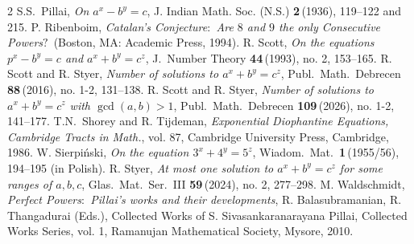 \documentclass[11pt]{amsart}
\numberwithin{equation}{section}
\begin{document}
\begin{thebibliography}{2}
%
S.S.~Pillai,
{\it On $a^x-b^y=c$}, J. Indian Math. Soc. (N.S.) {\bf 2}\,(1936), 119--122 and 215.
%
P. Ribenboim,
{\it Catalan's Conjecture$:$ Are $8$ and $9$ the only Consecutive Powers$?$}\,
(Boston, MA: Academic Press, 1994).
%
R. Scott,
{\it On the equations $p^x-b^y=c$ and $a^x+b^y=c^z$},
J.\ Number Theory {\bf 44}\,(1993), no. 2, 153--165.
%
R. Scott and R. Styer,
{\it Number of solutions to $a^x+b^y=c^z$},
Publ.\ Math.\ Debrecen {\bf 88}\,(2016), no. 1-2, 131--138.
%
R. Scott and R. Styer, 
{\it Number of solutions to $a^x+b^y=c^z$ with $\gcd(a,b)>1$}, 
Publ.\ Math.\ Debrecen {\bf 109}\,(2026), no. 1-2, 141--177.
%
T.N.~Shorey and R. Tijdeman,
{\it Exponential Diophantine Equations, Cambridge Tracts in Math.},
vol. 87, Cambridge University Press, Cambridge, 1986.
%
W. Sierpi\'nski,
{\it On the equation $3^x+4^y=5^z$},
Wiadom.\ Mat.\ {\bf 1}\,(1955/56), 194--195 (in Polish).
%
R. Styer,
{\it At most one solution to $a^x+b^y=c^z$ for some ranges of $a, b, c$},
Glas.\ Mat.\ Ser.\ III {\bf 59}\,(2024), no. 2, 277--298.
%
M. Waldschmidt, 
{\it Perfect Powers$:$ Pillai's works and their developments}, 
R. Balasubramanian, R. Thangadurai (Eds.), Collected Works of S. Sivasankaranarayana Pillai, Collected Works Series, vol. 1, Ramanujan Mathematical Society, Mysore, 2010.
\end{thebibliography}
\end{document}
